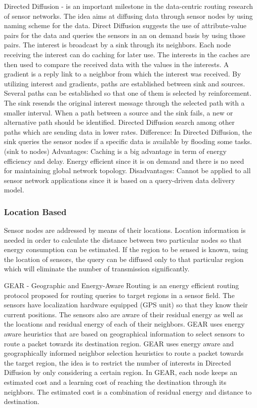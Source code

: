 Directed Diffusion - is an important milestone in the data-centric routing research of sensor networks. The idea aims at diffusing data through sensor nodes by using naming scheme for the data. Direct Diffusion suggests the use of attribute-value pairs for the data and queries the sensors in an on demand basis by using those pairs. The interest is broadcast by a sink through its neighbors. Each node receiving the interest can do caching for later use. The interests in the caches are then used to compare the received data with the values in the interests. A gradient is a reply link to a neighbor from which the interest was received. By utilizing interest and gradients, paths are established between sink and sources. Several paths can be established so that one of them is selected by reinforcement. The sink resends the original interest message through the selected path with a smaller interval. When a path between a source and the sink fails, a new or alternative path should be identified. Directed Diffusion search among other paths which are sending data in lower rates. 
Difference: In Directed Diffusion, the sink queries the sensor nodes if a specific data is available by flooding some tasks. (sink to nodes)
Advantages: Caching is a big advantage in term of energy efficiency and delay. Energy efficient since it is on demand and there is no need for maintaining global network topology.
Disadvantages: Cannot be applied to all sensor network applications since it is based on a query-driven data delivery model.

\subsubsection{Location Based}
Sensor nodes are addressed by means of their locations. Location information is needed in order to calculate the distance between two particular nodes so that energy consumption can be estimated. If the region to be sensed is known, using the location of sensors, the query can be diffused only to that particular region which will eliminate the number of transmission significantly. 

GEAR \cite{gear}- Geographic and Energy-Aware Routing is an energy efficient routing protocol proposed for routing queries to target regions in a sensor field. The sensors have localization hardware equipped (GPS unit) so that they know their current positions. The sensors also are aware of their residual energy as well as the locations and residual energy of each of their neighbors. GEAR uses energy aware heuristics that are based on geographical information to select sensors to route a packet towards its destination region. GEAR uses energy aware and geographically informed neighbor selection heuristics to route a packet towards the target region, the idea is to restrict the number of interests in Directed Diffusion by only considering a certain region. In GEAR, each node keeps an estimated cost and a learning cost of reaching the destination through its neighbors. The estimated cost is a combination of residual energy and distance to destination.

